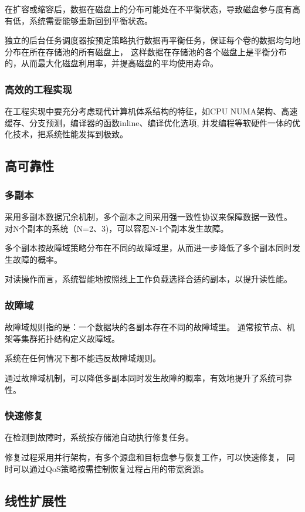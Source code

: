 在扩容或缩容后，数据在磁盘上的分布可能处在不平衡状态，导致磁盘参与度有高有低，系统需要能够重新回到平衡状态。

独立的后台任务调度器按预定策略执行数据再平衡任务，保证每个卷的数据均匀地分布在所在存储池的所有磁盘上，
这样数据在存储池的各个磁盘上是平衡分布的，从而最大化磁盘利用率，并提高磁盘的平均使用寿命。

\subsubsection{高效的工程实现}


在工程实现中要充分考虑现代计算机体系结构的特征，如CPU NUMA架构、高速缓存、分支预测，编译器的函数inline、编译优化选项,
并发编程等软硬件一体的优化技术，把系统性能发挥到极致。

\subsection{高可靠性}

\subsubsection{多副本}

采用多副本数据冗余机制，多个副本之间采用强一致性协议来保障数据一致性。
对N个副本的系统（N=2、3)，可以容忍N-1个副本发生故障。

多个副本按故障域策略分布在不同的故障域里，从而进一步降低了多个副本同时发生故障的概率。

对读操作而言，系统智能地按照线上工作负载选择合适的副本，以提升读性能。

\subsubsection{故障域}

故障域规则指的是：一个数据块的各副本存在不同的故障域里。
通常按节点、机架等集群拓扑结构定义故障域。

系统在任何情况下都不能违反故障域规则。

通过故障域机制，可以降低多副本同时发生故障的概率，有效地提升了系统可靠性。

\subsubsection{快速修复}

在检测到故障时，系统按存储池自动执行修复任务。

修复过程采用并行架构，有多个源盘和目标盘参与恢复工作，可以快速修复，
同时可以通过QoS策略按需控制恢复过程占用的带宽资源。

\subsection{线性扩展性}
